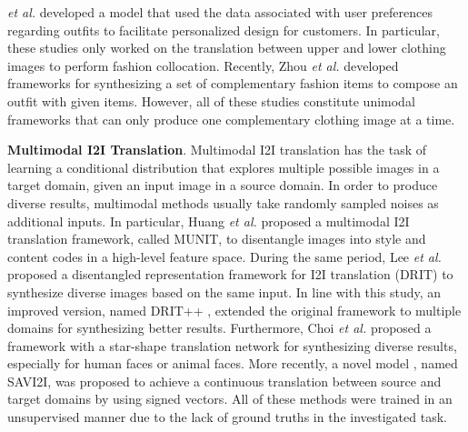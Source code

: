 \textit{et al.} \cite{yu2019personalized} developed a model that used the data associated with user preferences regarding outfits to facilitate personalized design for customers. In particular, these studies only worked on the translation between upper and lower clothing images to perform fashion collocation. Recently, Zhou \textit{et al.} \cite{outfitgan,coutfitgan} developed frameworks for synthesizing a set of complementary fashion items to compose an outfit with given items. However, all of these studies constitute unimodal frameworks that can only produce one complementary clothing image at a time.
	
	
	\textbf{Multimodal I2I Translation}. Multimodal I2I translation has the task of learning a conditional distribution that explores multiple possible images in a target domain, given an input image in a source domain. In order to produce diverse results, multimodal methods usually take randomly sampled noises as additional inputs. In particular, Huang \textit{et al.} \cite{huang2018multimodal} proposed a multimodal I2I translation framework, called MUNIT, to disentangle images into style and content codes in a high-level feature space. During the same period, Lee \textit{et al.} \cite{lee2018diverse} proposed a disentangled representation framework for I2I translation (DRIT) to synthesize diverse images based on the same input. In line with this study, an improved version, named DRIT++ \cite{lee2020drit++}, extended the original framework to multiple domains for synthesizing better results. Furthermore, Choi \textit{et al.} \cite{choi2020starganv2} proposed a framework with a star-shape translation network for synthesizing diverse results, especially for human faces or animal faces. More recently, a novel model \cite{mao2022continuous}, named SAVI2I, was proposed to achieve a continuous translation between source and target domains by using signed vectors. All of these methods were trained in an unsupervised manner due to the lack of ground truths in the investigated task.
	
